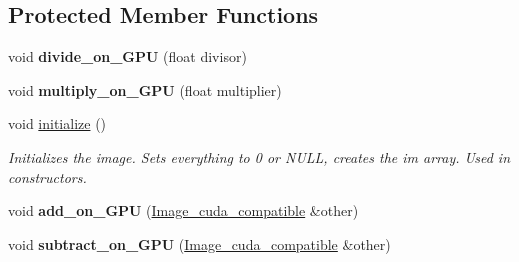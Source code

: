 \subsection*{Protected Member Functions}
\begin{DoxyCompactItemize}
\item 
void {\bfseries divide\+\_\+on\+\_\+\+G\+PU} (float divisor)\hypertarget{classImage__cuda__compatible_a4538c764a8101d4008598f2b4fb69c6c}{}\label{classImage__cuda__compatible_a4538c764a8101d4008598f2b4fb69c6c}

\item 
void {\bfseries multiply\+\_\+on\+\_\+\+G\+PU} (float multiplier)\hypertarget{classImage__cuda__compatible_af27e57aacd0ef5381b04cd4298f0996e}{}\label{classImage__cuda__compatible_af27e57aacd0ef5381b04cd4298f0996e}

\item 
void \hyperlink{classImage__cuda__compatible_a5ab957eedf46e3fd9f6deeec0e850e98}{initialize} ()
\begin{DoxyCompactList}\small\item\em Initializes the image. Sets everything to 0 or N\+U\+LL, creates the im array. Used in constructors. \end{DoxyCompactList}\item 
void {\bfseries add\+\_\+on\+\_\+\+G\+PU} (\hyperlink{classImage__cuda__compatible}{Image\+\_\+cuda\+\_\+compatible} \&other)\hypertarget{classImage__cuda__compatible_a3d5049463d7ad72ca1ce89d73a4f446f}{}\label{classImage__cuda__compatible_a3d5049463d7ad72ca1ce89d73a4f446f}

\item 
void {\bfseries subtract\+\_\+on\+\_\+\+G\+PU} (\hyperlink{classImage__cuda__compatible}{Image\+\_\+cuda\+\_\+compatible} \&other)\hypertarget{classImage__cuda__compatible_af766b848ac22ab22717473aaa0f1850c}{}\label{classImage__cuda__compatible_af766b848ac22ab22717473aaa0f1850c}

\end{DoxyCompactItemize}
